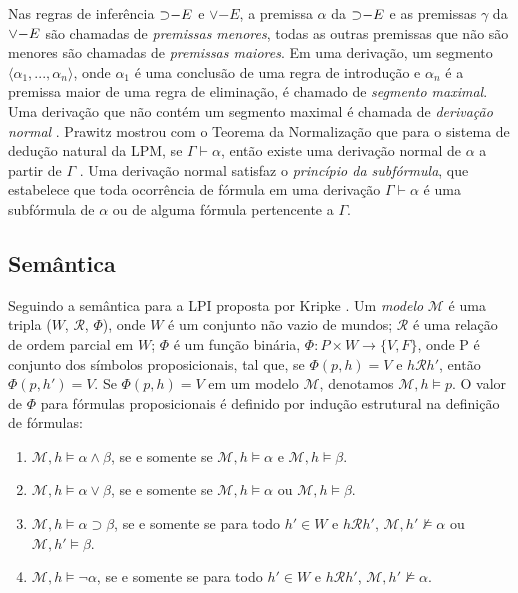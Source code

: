 Nas regras de inferência $\mathord{\supset}{-E}$ e $\lor{-E}$, a premissa $\alpha$ da $\mathord{\supset}{-E}$ e as premissas $\gamma$ da $\mathord{\lor}{-E}$ são chamadas de \textit{premissas menores}, todas as outras premissas que não são menores são chamadas de \textit{premissas maiores}. Em uma derivação, um segmento $\langle \alpha_1, ..., \alpha_n \rangle$, onde $\alpha_1$ é uma conclusão de uma regra de introdução e $\alpha_n$ é a premissa maior de uma regra de eliminação, é chamado de \textit{segmento maximal}. Uma derivação que não contém um segmento maximal é chamada de \textit{derivação normal} \cite{Prawitz1965}. Prawitz mostrou com o Teorema da Normalização que para o sistema de dedução natural da LPM, se $\Gamma \vdash \alpha$, então existe uma derivação normal de $\alpha$ a partir de $\Gamma$ \cite{Prawitz1965}. Uma derivação normal satisfaz o \textit{princípio da subfórmula}, que estabelece que toda ocorrência de fórmula em uma derivação $\Gamma \vdash \alpha$ é uma subfórmula de $\alpha$ ou de alguma fórmula pertencente a $\Gamma$.

\subsection{Semântica}

Seguindo a semântica para a LPI proposta por Kripke \cite{KRIPKE196592}. Um \textit{modelo} $\mathcal{M}$ é uma tripla ($W$, $\mathcal{R}$, $\Phi$), onde $W$ é um conjunto não vazio de mundos; $\mathcal{R}$ é uma relação de ordem parcial em $W$; $\Phi$ é um função binária, $\Phi: P \times W \rightarrow \{V, F\}$, onde P é conjunto dos símbolos proposicionais, tal que, se $\Phi(p, h) = V$ e $h\mathcal{R}h'$, então $\Phi(p, h') = V$. Se $\Phi(p, h) = V$ em um modelo $\mathcal{M}$, denotamos $\mathcal{M}, h \vDash p$. O valor de $\Phi$ para fórmulas proposicionais é definido por indução estrutural na definição de fórmulas:

\begin{enumerate}
    \item $\mathcal{M}, h \vDash \alpha \land \beta$, se e somente se $\mathcal{M}, h \vDash \alpha$ e $\mathcal{M}, h \vDash \beta$.
    \item $\mathcal{M}, h \vDash \alpha \lor \beta$, se e somente se $\mathcal{M}, h \vDash \alpha$ ou $\mathcal{M}, h \vDash \beta$.
    \item $\mathcal{M}, h \vDash \alpha \supset \beta$, se e somente se para todo $h' \in W$ e $h\mathcal{R}h'$, $\mathcal{M}, h' \nvDash \alpha$ ou $\mathcal{M}, h' \vDash \beta$.
    \item $\mathcal{M}, h \vDash \neg\alpha$, se e somente se para todo $h' \in W$ e $h\mathcal{R}h'$, $\mathcal{M}, h' \nvDash \alpha$.
\end{enumerate}

